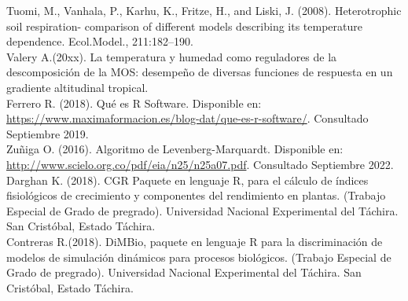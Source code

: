 \noindent
Tuomi, M., Vanhala, P., Karhu, K., Fritze, H., and Liski, J. (2008). Heterotrophic soil respiration- comparison of different models describing its temperature dependence. Ecol.Model., 211:182–190.\\

\noindent
Valery A.(20xx). La temperatura y humedad como reguladores de la descomposici\'on de la MOS: desempeño de diversas funciones de respuesta en un gradiente altitudinal tropical.\\

\noindent
Ferrero R. (2018). Qu\'e es R Software. Disponible en: \url{https://www.maximaformacion.es/blog-dat/que-es-r-software/}. Consultado Septiembre 2019.\\

\noindent
Zu\~niga O. (2016). Algoritmo de Levenberg-Marquardt. Disponible en: \url{http://www.scielo.org.co/pdf/eia/n25/n25a07.pdf}. Consultado Septiembre 2022.\\

\noindent
Darghan K. (2018). CGR Paquete en lenguaje R, para el c\'alculo de índices fisiol\'ogicos de crecimiento y componentes del rendimiento en plantas. (Trabajo Especial de Grado de pregrado). Universidad Nacional Experimental del T\'achira. San Crist\'obal, Estado T\'achira.\\

\noindent
Contreras R.(2018). DiMBio, paquete en lenguaje R para la discriminaci\'on de modelos de simulaci\'on din\'amicos para procesos biol\'ogicos. (Trabajo Especial de Grado de pregrado). Universidad Nacional Experimental del T\'achira. San Crist\'obal, Estado T\'achira.\\
